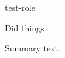 \documentclass{resume}
\begin{document}
\begin{experience}
  \begin{role}{test-role}
    \item Did things
  \end{role}
\end{experience}
\begin{summary}
  Summary text.
\end{summary}
\end{document}
